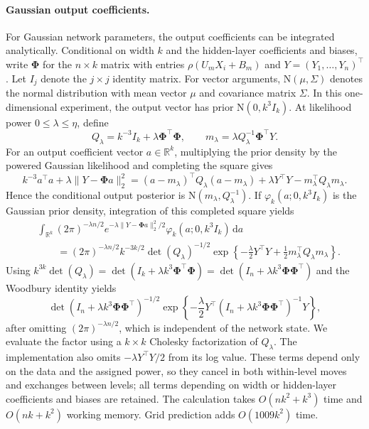 \documentclass[11pt,a4paper]{article}
\theoremstyle{remark}
\newcommand{\norm}[1]{\lVert#1\rVert}
\begin{document}
\paragraph{{Gaussian {output coefficients}.}}
For Gaussian network parameters, the {output coefficients} can be integrated
analytically. Conditional on width $k$ and the {hidden-layer coefficients and biases},
write $\boldsymbol\Phi$ for the $n\times k$ matrix with entries
$\rho(U_mX_i+B_m)$ and $Y=(Y_1,\ldots,Y_n)^\top$.
Let $I_j$ denote the $j\times j$ identity matrix. For vector arguments,
$\mathrm N(\mu,\Sigma)$ denotes the normal distribution with mean
vector $\mu$ and covariance matrix $\Sigma$. In this
one-dimensional experiment, the output vector has prior
$\mathrm N(0,k^3I_k)$.
At likelihood power $0\leq\lambda\leq\eta$, define
\begin{equation}\label{eq:simulation-collapse}
Q_\lambda=k^{-3}I_k+\lambda\boldsymbol\Phi^\top\boldsymbol\Phi,
\qquad
m_\lambda=\lambda Q_\lambda^{-1}\boldsymbol\Phi^\top Y.
\end{equation}
For an {output coefficient vector} $a\in\mathbb R^k$, multiplying
the prior density by the powered Gaussian likelihood and
completing the square gives
\[
k^{-3}a^\top a+\lambda\norm{Y-\boldsymbol\Phi a}_2^2
=(a-m_\lambda)^\top Q_\lambda(a-m_\lambda)
+\lambda Y^\top Y-m_\lambda^\top Q_\lambda m_\lambda.
\]
Hence the conditional output posterior is
$\mathrm N(m_\lambda,Q_\lambda^{-1})$.
If $\varphi_k(a;0,k^3I_k)$ is the Gaussian prior density, integration
of this completed square yields
\[
\begin{split}
&\int_{\mathbb R^k}(2\pi)^{-\lambda n/2}
 e^{-\lambda\norm{Y-\boldsymbol\Phi a}_2^2/2}
 \varphi_k(a;0,k^3I_k)\,\mathrm d a\\
&\qquad=(2\pi)^{-\lambda n/2}k^{-3k/2}\det(Q_\lambda)^{-1/2}
 \exp\left\{-\frac\lambda2Y^\top Y
 +\frac12m_\lambda^\top Q_\lambda m_\lambda\right\}.
\end{split}
\]
Using
$k^{3k}\det(Q_\lambda)
=\det(I_k+\lambda k^3\boldsymbol\Phi^\top\boldsymbol\Phi)
=\det(I_n+\lambda k^3\boldsymbol\Phi\boldsymbol\Phi^\top)$
and the Woodbury identity yields
\begin{equation}\label{eq:simulation-marginal}
\det(I_n+\lambda k^3\boldsymbol\Phi\boldsymbol\Phi^\top)^{-1/2}
\exp\left\{-\frac\lambda2Y^\top
(I_n+\lambda k^3\boldsymbol\Phi\boldsymbol\Phi^\top)^{-1}Y\right\},
\end{equation}
after omitting $(2\pi)^{-\lambda n/2}$, which is independent of the
network state.
We evaluate the factor using a $k\times k$ Cholesky factorization of
$Q_\lambda$. The implementation also omits $-\lambda Y^\top Y/2$
from its log value. These terms depend only on the data and the assigned power, so they
cancel in both within-level moves and exchanges between levels;
all terms depending on width or
{hidden-layer coefficients and biases} are retained. The calculation takes
$O(nk^2+k^3)$ time and $O(nk+k^2)$ working memory.
Grid prediction adds $O(1009k^2)$ time.
\end{document}
